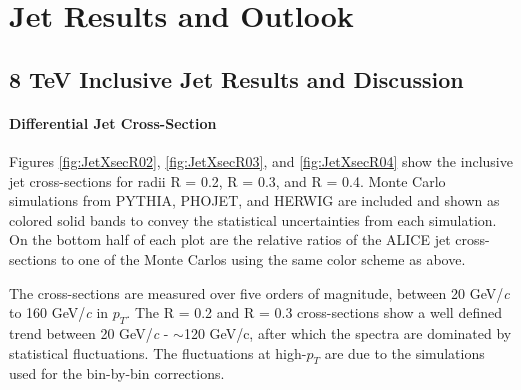 \chapter{Jet Results and Outlook} \label{ch:cando}

\section{8 TeV Inclusive Jet Results and Discussion}

\subsubsection{Differential Jet Cross-Section}


\noindent
Figures \ref{fig:JetXsecR02}, \ref{fig:JetXsecR03}, and \ref{fig:JetXsecR04} show the inclusive jet cross-sections for radii R = 0.2, R = 0.3, and R = 0.4.  Monte Carlo simulations from PYTHIA, PHOJET, and HERWIG are included and shown as colored solid bands to convey the statistical uncertainties from each simulation.  On the bottom half of each plot are the relative ratios of the ALICE jet cross-sections to one of the Monte Carlos using the same color scheme as above.  

The cross-sections are measured over five orders of magnitude, between 20 GeV/\textit{c} to 160 GeV/\textit{c} in $p_{T}$. The R = 0.2 and R = 0.3 cross-sections show a well defined trend between 20 GeV/\textit{c} - $\sim$120 GeV/c, after which the spectra are dominated by statistical fluctuations.  The fluctuations at high-$p_{T}$ are due to the simulations used  for the bin-by-bin corrections.  

